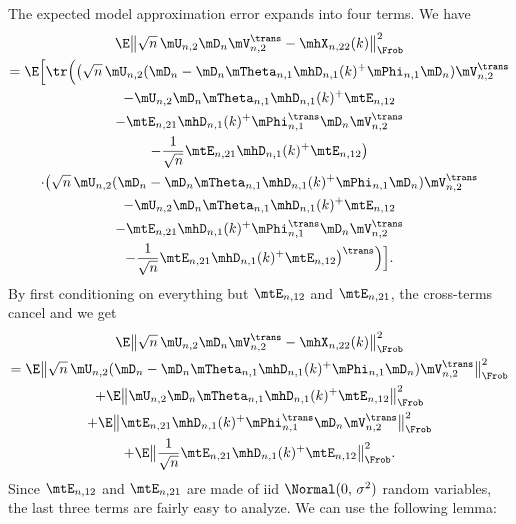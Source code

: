 The expected model approximation error expands into four terms.  We have
\begin{multline}
	\E \big\|
		\sqrt{n} \, \mU_{n,2} \mD_n \mV_{n,2}^\trans
		-
		\mhX_{n,22}(k)
	\big\|_\Frob^2 \\
		=
			\E\Big[ 
				\tr \Big(
					\big(
						\sqrt{n} \,
						\mU_{n,2} 
						( 
							\mD_n 
							- 
							\mD_n 
							\mTheta_{n,1} \mhD_{n,1}(k)^+ \mPhi_{n,1}
							\mD_n
						)
						\mV_{n,2}^\trans \\
						-
						\mU_{n,2} 
						\mD_n \mTheta_{n,1} \mhD_{n,1}(k)^+ 
						\mtE_{n,12} \\
						- 
						\mtE_{n,21}
						\mhD_{n,1}(k)^+ \mPhi_{n,1}^\trans \mD_n 
						\mV_{n,2}^\trans \\
						-
						\frac{1}{\sqrt{n}}
						\mtE_{n,21}
						\mhD_{n,1}(k)^+
						\mtE_{n,12}
					\big) \\
					\cdot
					\big(
						\sqrt{n} \,
						\mU_{n,2} 
						( 
							\mD_n 
							- 
							\mD_n 
							\mTheta_{n,1} \mhD_{n,1}(k)^+ \mPhi_{n,1}
							\mD_n
						)
						\mV_{n,2}^\trans \\
						-
						\mU_{n,2} 
						\mD_n \mTheta_{n,1} \mhD_{n,1}(k)^+ 
						\mtE_{n,12} \\
						- 
						\mtE_{n,21}
						\mhD_{n,1}(k)^+ \mPhi_{n,1}^\trans \mD_n 
						\mV_{n,2}^\trans \\
						-
						\frac{1}{\sqrt{n}}
						\mtE_{n,21}
						\mhD_{n,1}(k)^+
						\mtE_{n,12}
					\big)^\trans
				\Big)
			\Big].
\end{multline}
By first conditioning on everything but $\mtE_{n,12}$ and $\mtE_{n,21}$, the
cross-terms cancel and we get
\begin{multline}
	\E \big\|
		\sqrt{n} \, \mU_{n,2} \mD_n \mV_{n,2}^\trans
		-
		\mhX_{n,22}(k)
	\big\|_\Frob^2 \\
		=
			\E\big\|
				\sqrt{n} \,
				\mU_{n,2} 
				( 
					\mD_n 
					- 
					\mD_n 
					\mTheta_{n,1} \mhD_{n,1}(k)^+ \mPhi_{n,1}
					\mD_n
				)
				\mV_{n,2}^\trans 
			\big\|_\Frob^2 \\
			+
			\E\big\|
				\mU_{n,2} 
				\mD_n \mTheta_{n,1} \mhD_{n,1}(k)^+ 
				\mtE_{n,12}
			\big\|_\Frob^2 \\
			+
			\E\big\|
				\mtE_{n,21}
				\mhD_{n,1}(k)^+ \mPhi_{n,1}^\trans \mD_n 
				\mV_{n,2}^\trans
			\big\|_\Frob^2 \\
			+
			\E\big\|
				\frac{1}{\sqrt{n}}
				\mtE_{n,21}
				\mhD_{n,1}(k)^+
				\mtE_{n,12}
			\big\|_\Frob^2.
\end{multline}
Since $\mtE_{n,12}$ and $\mtE_{n,21}$ are made of iid $\Normal( 0, \, \sigma^2)$ random variables, the last three terms are fairly easy to analyze.
We can use the following lemma:

